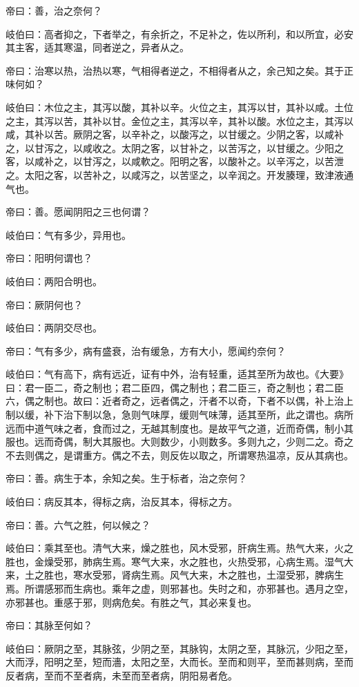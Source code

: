 \documentclass{article}%
\begin{document}
帝曰：善，治之奈何？

岐伯曰：高者抑之，下者举之，有余折之，不足补之，佐以所利，和以所宜，必安其主客，适其寒温，同者逆之，异者从之。

帝曰：治寒以热，治热以寒，气相得者逆之，不相得者从之，余己知之矣。其于正味何如？

岐伯曰：木位之主，其泻以酸，其补以辛。火位之主，其泻以甘，其补以咸。土位之主，其泻以苦，其补以甘。金位之主，其泻以辛，其补以酸。水位之主，其泻以咸，其补以苦。厥阴之客，以辛补之，以酸泻之，以甘缓之。少阴之客，以咸补之，以甘泻之，以咸收之。太阴之客，以甘补之，以苦泻之，以甘缓之。少阳之客，以咸补之，以甘泻之，以咸軟之。阳明之客，以酸补之。以辛泻之，以苦泄之。太阳之客，以苦补之，以咸泻之，以苦坚之，以辛润之。开发腠理，致津液通气也。

帝曰：善。愿闻阴阳之三也何谓？

岐伯曰：气有多少，异用也。

帝曰：阳明何谓也？

岐伯曰：两阳合明也。

帝曰：厥阴何也？

岐伯曰：两阴交尽也。

帝曰：气有多少，病有盛衰，治有缓急，方有大小，愿闻约奈何？

岐伯曰：气有高下，病有远近，证有中外，治有轻重，适其至所为故也。《大要》曰：君一臣二，奇之制也；君二臣四，偶之制也；君二臣三，奇之制也；君二臣六，偶之制也。故曰：近者奇之，远者偶之，汗者不以奇，下者不以偶，补上治上制以缓，补下治下制以急，急则气味厚，缓则气味薄，适其至所，此之谓也。病所远而中道气味之者，食而过之，无越其制度也。是故平气之道，近而奇偶，制小其服也。远而奇偶，制大其服也。大则数少，小则数多。多则九之，少则二之。奇之不去则偶之，是谓重方。偶之不去，则反佐以取之，所谓寒热温凉，反从其病也。

帝曰：善。病生于本，余知之矣。生于标者，治之奈何？

岐伯曰：病反其本，得标之病，治反其本，得标之方。

帝曰：善。六气之胜，何以候之？

岐伯曰：乘其至也。清气大来，燥之胜也，风木受邪，肝病生焉。热气大来，火之胜也，金燥受邪，肺病生焉。寒气大来，水之胜也，火热受邪，心病生焉。湿气大来，土之胜也，寒水受邪，肾病生焉。风气大来，木之胜也，土湿受邪，脾病生焉。所谓感邪而生病也。乘年之虚，则邪甚也。失时之和，亦邪甚也。遇月之空，亦邪甚也。重感于邪，则病危矣。有胜之气，其必来复也。

帝曰：其脉至何如？

岐伯曰：厥阴之至，其脉弦，少阴之至，其脉钩，太阴之至，其脉沉，少阳之至，大而浮，阳明之至，短而濇，太阳之至，大而长。至而和则平，至而甚则病，至而反者病，至而不至者病，未至而至者病，阴阳易者危。
\end{document}
